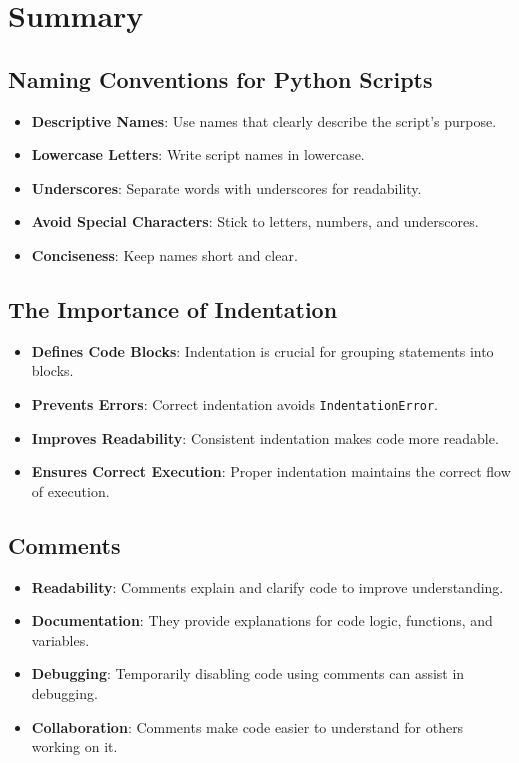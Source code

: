 \section{Summary}

\subsection{Naming Conventions for Python Scripts}
\begin{itemize}
    \item \textbf{Descriptive Names}: Use names that clearly describe the script's purpose.
    \item \textbf{Lowercase Letters}: Write script names in lowercase.
    \item \textbf{Underscores}: Separate words with underscores for readability.
    \item \textbf{Avoid Special Characters}: Stick to letters, numbers, and underscores.
    \item \textbf{Conciseness}: Keep names short and clear.
\end{itemize}

\subsection{The Importance of Indentation}
\begin{itemize}
    \item \textbf{Defines Code Blocks}: Indentation is crucial for grouping statements into blocks.
    \item \textbf{Prevents Errors}: Correct indentation avoids \texttt{IndentationError}.
    \item \textbf{Improves Readability}: Consistent indentation makes code more readable.
    \item \textbf{Ensures Correct Execution}: Proper indentation maintains the correct flow of execution.
\end{itemize}

\subsection{Comments}
\begin{itemize}
    \item \textbf{Readability}: Comments explain and clarify code to improve understanding.
    \item \textbf{Documentation}: They provide explanations for code logic, functions, and variables.
    \item \textbf{Debugging}: Temporarily disabling code using comments can assist in debugging.
    \item \textbf{Collaboration}: Comments make code easier to understand for others working on it.
\end{itemize}

